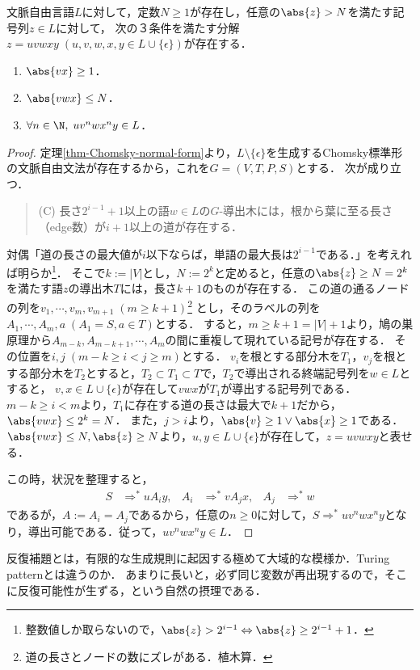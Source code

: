 \begin{theorem}\label{thm-Pumping-lemma-CFL}
    文脈自由言語$L$に対して，定数$N\ge 1$が存在し，任意の$\abs{z}>N$を満たす記号列$z\in L$に対して，
    次の３条件を満たす分解$z=uvwxy\;(u,v,w,x,y\in L\cup\{\epsilon\})$が存在する．
    \begin{enumerate}
        \item $\abs{vx}\ge 1$．
        \item $\abs{vwx}\le N$．
        \item $\forall n\in\N,\;uv^nwx^ny\in L$．
    \end{enumerate}
\end{theorem}
\begin{proof}
    定理\ref{thm-Chomsky-normal-form}より，$L\setminus\{\epsilon\}$を生成するChomsky標準形の文脈自由文法が存在するから，これを$G=(V,T,P,S)$とする．
    次が成り立つ．
    \begin{quote}
        (C) 長さ$2^{i-1}+1$以上の語$w\in L$の$G$-導出木には，根から葉に至る長さ（edge数）が$i+1$以上の道が存在する．
    \end{quote}
    対偶「道の長さの最大値が$i$以下ならば，単語の最大長は$2^{i-1}$である．」を考えれば明らか\footnote{整数値しか取らないので，$\abs{z}>2^{i-1}\Leftrightarrow\abs{z}\ge 2^{i-1}+1$．}．
    そこで$k:=|V|$とし，$N:=2^k$と定めると，任意の$\abs{z}\ge N=2^k$を満たす語$z$の導出木$T$には，長さ$k+1$のものが存在する．
    この道の通るノードの列を$v_1,\cdots,v_m,v_{m+1}\;(m\ge k+1)$\footnote{道の長さとノードの数にズレがある．植木算．}
    とし，そのラベルの列を$A_1,\cdots,A_m,a\;(A_1=S,a\in T)$とする．
    すると，$m\ge k+1=|V|+1$より，鳩の巣原理から$A_{m-k},A_{m-k+1},\cdots,A_m$の間に重複して現れている記号が存在する．
    その位置を$i,j\;(m-k\ge i<j\ge m)$とする．
    $v_i$を根とする部分木を$T_1$，$v_j$を根とする部分木を$T_2$とすると，$T_2\subset T_1\subset T$で，$T_2$で導出される終端記号列を$w\in L$とすると，
    $v,x\in L\cup\{\epsilon\}$が存在して$vwx$が$T_1$が導出する記号列である．
    $m-k\ge i< m$より，$T_1$に存在する道の長さは最大で$k+1$だから，$\abs{vwx}\le 2^k=N$．
    また，$j>i$より，$\abs{v}\ge 1\lor\abs{x}\ge 1$である．
    $\abs{vwx}\le N,\abs{z}\ge N$より，$u,y\in L\cup\{\epsilon\}$が存在して，$z=uvwxy$と表せる．

    この時，状況を整理すると，
    \begin{align*}
        S&\Rightarrow^*uA_iy,&A_i&\Rightarrow^*vA_jx,&A_j&\Rightarrow^*w
    \end{align*}
    であるが，$A:=A_i=A_j$であるから，任意の$n\ge 0$に対して，$S\Rightarrow^*uv^nwx^ny$となり，導出可能である．従って，$uv^nwx^ny\in L$．
\end{proof}
\begin{remarks}
    反復補題とは，有限的な生成規則に起因する極めて大域的な模様か．Turing patternとは違うのか．
    あまりに長いと，必ず同じ変数が再出現するので，そこに反復可能性が生ずる，という自然の摂理である．
\end{remarks}

